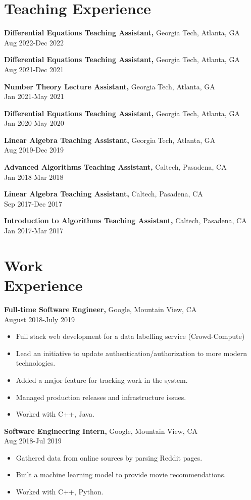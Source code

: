 \documentclass[10pt, letterpaper]{article}
\begin{document}
\section{Teaching Experience}
{\bf Differential Equations Teaching Assistant,} Georgia Tech, Atlanta, GA \\ Aug 2022-Dec 2022

{\bf Differential Equations Teaching Assistant,} Georgia Tech, Atlanta, GA \\ Aug 2021-Dec 2021

{\bf Number Theory Lecture Assistant,} Georgia Tech, Atlanta, GA \\ Jan 2021-May 2021

{\bf Differential Equations Teaching Assistant,} Georgia Tech, Atlanta, GA \\ Jan 2020-May 2020

{\bf Linear Algebra Teaching Assistant,} Georgia Tech, Atlanta, GA \\ Aug 2019-Dec 2019

{\bf Advanced Algorithms Teaching Assistant,} Caltech, Pasadena, CA \\ Jan 2018-Mar 2018

{\bf Linear Algebra Teaching Assistant,} Caltech, Pasadena, CA \\ Sep 2017-Dec 2017

{\bf Introduction to Algorithms Teaching Assistant,} Caltech, Pasadena, CA \\ Jan 2017-Mar 2017

 \section{Work\\ Experience}
 {\bf Full-time Software Engineer,} Google, Mountain View, CA \\ August 2018-July 2019
 \begin{itemize} \itemsep -2pt  %
 \item Full stack web development for a data labelling service (Crowd-Compute)
 \item Lead an initiative to update authentication/authorization to more modern technologies.
 \item Added a major feature for tracking work in the system.
 \item Managed production releases and infrastructure issues.
 \item Worked with C++, Java.
 \end{itemize}
 
{\bf Software Engineering Intern,} Google, Mountain View, CA \\ Aug 2018-Jul 2019
\begin{itemize} \itemsep -2pt %
\item Gathered data from online sources by parsing Reddit pages.
\item Built a machine learning model to provide movie recommendations.
\item Worked with C++, Python.
\end{itemize}
\end{document}
